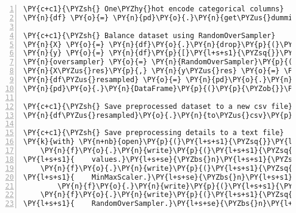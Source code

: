 \documentclass[12pt]{article}
\begin{document}
\begin{Verbatim}[commandchars=\\\{\},numbers=left,firstnumber=1,stepnumber=1,formatcom=\footnotesize]
\PY{c+c1}{\PYZsh{} One\PYZhy{}hot encode categorical columns}
\PY{n}{df} \PY{o}{=} \PY{n}{pd}\PY{o}{.}\PY{n}{get\PYZus{}dummies}\PY{p}{(}\PY{n}{df}\PY{p}{,} \PY{n}{columns}\PY{o}{=}\PY{p}{[}\PY{l+s+s1}{\PYZsq{}}\PY{l+s+s1}{Age}\PY{l+s+s1}{\PYZsq{}}\PY{p}{,} \PY{l+s+s1}{\PYZsq{}}\PY{l+s+s1}{Education}\PY{l+s+s1}{\PYZsq{}}\PY{p}{,} \PY{l+s+s1}{\PYZsq{}}\PY{l+s+s1}{Income}\PY{l+s+s1}{\PYZsq{}}\PY{p}{]}\PY{p}{)}

\PY{c+c1}{\PYZsh{} Balance dataset using RandomOverSampler}
\PY{n}{X} \PY{o}{=} \PY{n}{df}\PY{o}{.}\PY{n}{drop}\PY{p}{(}\PY{p}{[}\PY{l+s+s1}{\PYZsq{}}\PY{l+s+s1}{Diabetes\PYZus{}binary}\PY{l+s+s1}{\PYZsq{}}\PY{p}{]}\PY{p}{,} \PY{n}{axis}\PY{o}{=}\PY{l+m+mi}{1}\PY{p}{)}
\PY{n}{y} \PY{o}{=} \PY{n}{df}\PY{p}{[}\PY{l+s+s1}{\PYZsq{}}\PY{l+s+s1}{Diabetes\PYZus{}binary}\PY{l+s+s1}{\PYZsq{}}\PY{p}{]}
\PY{n}{oversampler} \PY{o}{=} \PY{n}{RandomOverSampler}\PY{p}{(}\PY{n}{random\PYZus{}state}\PY{o}{=}\PY{l+m+mi}{42}\PY{p}{)}
\PY{n}{X\PYZus{}res}\PY{p}{,} \PY{n}{y\PYZus{}res} \PY{o}{=} \PY{n}{oversampler}\PY{o}{.}\PY{n}{fit\PYZus{}resample}\PY{p}{(}\PY{n}{X}\PY{p}{,} \PY{n}{y}\PY{p}{)}
\PY{n}{df\PYZus{}resampled} \PY{o}{=} \PY{n}{pd}\PY{o}{.}\PY{n}{concat}\PY{p}{(}\PY{p}{[}\PY{n}{pd}\PY{o}{.}\PY{n}{DataFrame}\PY{p}{(}\PY{n}{X\PYZus{}res}\PY{p}{)}\PY{p}{,} \PYZbs{}
\PY{n}{pd}\PY{o}{.}\PY{n}{DataFrame}\PY{p}{(}\PY{p}{\PYZob{}}\PY{l+s+s1}{\PYZsq{}}\PY{l+s+s1}{Diabetes\PYZus{}binary}\PY{l+s+s1}{\PYZsq{}}\PY{p}{:} \PY{n}{y\PYZus{}res}\PY{p}{\PYZcb{}}\PY{p}{)}\PY{p}{]}\PY{p}{,} \PY{n}{axis}\PY{o}{=}\PY{l+m+mi}{1}\PY{p}{)}

\PY{c+c1}{\PYZsh{} Save preprocessed dataset to a new csv file}
\PY{n}{df\PYZus{}resampled}\PY{o}{.}\PY{n}{to\PYZus{}csv}\PY{p}{(}\PY{l+s+s1}{\PYZsq{}}\PY{l+s+s1}{diabetes\PYZus{}preprocessed.csv}\PY{l+s+s1}{\PYZsq{}}\PY{p}{,} \PY{n}{index}\PY{o}{=}\PY{k+kc}{False}\PY{p}{)}

\PY{c+c1}{\PYZsh{} Save preprocessing details to a text file}
\PY{k}{with} \PY{n+nb}{open}\PY{p}{(}\PY{l+s+s1}{\PYZsq{}}\PY{l+s+s1}{data\PYZus{}preprocessing.txt}\PY{l+s+s1}{\PYZsq{}}\PY{p}{,} \PY{l+s+s1}{\PYZsq{}}\PY{l+s+s1}{w}\PY{l+s+s1}{\PYZsq{}}\PY{p}{)} \PY{k}{as} \PY{n}{f}\PY{p}{:}
    \PY{n}{f}\PY{o}{.}\PY{n}{write}\PY{p}{(}\PY{l+s+s1}{\PYZsq{}}\PY{l+s+s1}{Missing values have been dropped or imputed with mean }\PY{l+s+se}{\PYZbs{}}
\PY{l+s+s1}{    values.}\PY{l+s+se}{\PYZbs{}n}\PY{l+s+s1}{\PYZsq{}}\PY{p}{)}
    \PY{n}{f}\PY{o}{.}\PY{n}{write}\PY{p}{(}\PY{l+s+s1}{\PYZsq{}}\PY{l+s+s1}{Numeric columns have been normalized using }\PY{l+s+se}{\PYZbs{}}
\PY{l+s+s1}{    MinMaxScaler.}\PY{l+s+se}{\PYZbs{}n}\PY{l+s+s1}{\PYZsq{}}\PY{p}{)}
        \PY{n}{f}\PY{o}{.}\PY{n}{write}\PY{p}{(}\PY{l+s+s1}{\PYZsq{}}\PY{l+s+s1}{Categorical columns have been one\PYZhy{}hot encoded.}\PY{l+s+se}{\PYZbs{}n}\PY{l+s+s1}{\PYZsq{}}\PY{p}{)}
    \PY{n}{f}\PY{o}{.}\PY{n}{write}\PY{p}{(}\PY{l+s+s1}{\PYZsq{}}\PY{l+s+s1}{The dataset has been balanced using }\PY{l+s+se}{\PYZbs{}}
\PY{l+s+s1}{    RandomOverSampler.}\PY{l+s+se}{\PYZbs{}n}\PY{l+s+s1}{\PYZsq{}}\PY{p}{)}
\end{Verbatim}
\end{document}
